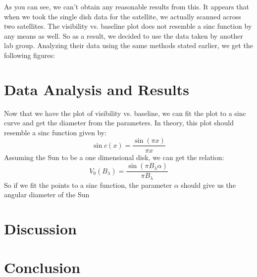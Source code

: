 \documentclass{aastex61}
\begin{document}
As you can see, we can't obtain any reasonable results from this. It appears that when we took the single dish data for the satellite, we actually scanned across two satellites. The visibility vs. baseline plot does not resemble a sinc function by any means as well. So as a result, we decided to use the data taken by another lab group. Analyzing their data using the same methods stated earlier, we get the following figures:
\section{Data Analysis and Results}
Now that we have the plot of visibility vs. baseline, we can fit the plot to a sinc curve and get the diameter from the parameters. In theory, this plot should resemble a sinc function given by:
\begin{equation}
\sin\textit{c}(x) = \frac{\sin(\pi x)}{\pi x}
\end{equation}
Assuming the Sun to be a one dimensional disk, we can get the relation:
\begin{equation}
V_{0}(B_{\lambda}) = \frac{\sin(\pi B_{\lambda} \alpha)}{\pi B_{\lambda}}
\end{equation}
So if we fit the points to a sinc function, the parameter $\alpha$ should give us the angular diameter of the Sun
\section{Discussion}

\section{Conclusion }



\begin{thebibliography}{9}	
	
\end{thebibliography}

\appendix
\end{document}
